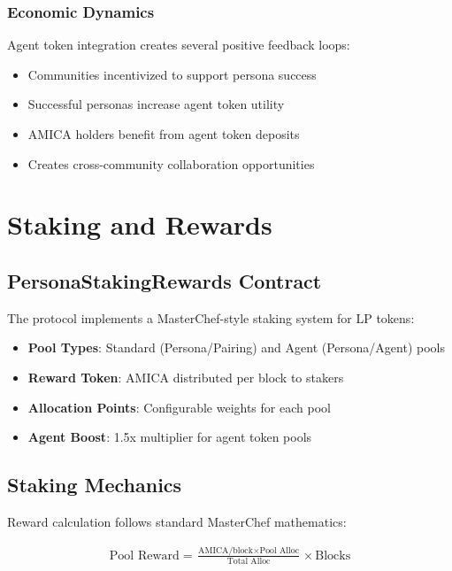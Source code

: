 \documentclass{article}
\begin{document}
\subsubsection{Economic Dynamics}
Agent token integration creates several positive feedback loops:
\begin{itemize}
    \item Communities incentivized to support persona success
    \item Successful personas increase agent token utility
    \item AMICA holders benefit from agent token deposits
    \item Creates cross-community collaboration opportunities
\end{itemize}

\section{Staking and Rewards}

\subsection{PersonaStakingRewards Contract}

The protocol implements a MasterChef-style staking system for LP tokens:

\begin{itemize}
    \item \textbf{Pool Types}: Standard (Persona/Pairing) and Agent (Persona/Agent) pools
    \item \textbf{Reward Token}: AMICA distributed per block to stakers
    \item \textbf{Allocation Points}: Configurable weights for each pool
    \item \textbf{Agent Boost}: 1.5x multiplier for agent token pools
\end{itemize}

\subsection{Staking Mechanics}

Reward calculation follows standard MasterChef mathematics:

\begin{align}
\text{Pool Reward} = \frac{\text{AMICA/block} \times \text{Pool Alloc}}{\text{Total Alloc}} \times \text{Blocks}
\end{align}
\end{document}
